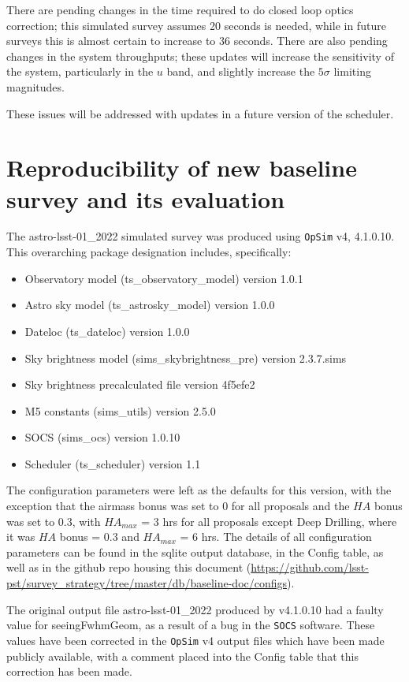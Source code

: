 \documentclass[DM,authoryear,toc]{lsstdoc}
\newcommand{\opsim}{\texttt{OpSim}\xspace}
\newcommand{\socs}{\texttt{SOCS}\xspace}
\begin{document}
There are pending changes in the time required to do closed loop optics correction; this simulated survey assumes 20 seconds is needed, while in future surveys this is almost certain to increase to 36 seconds.  There are also pending changes in the system throughputs; these updates will increase the sensitivity of the system, particularly in the $u$ band, and slightly increase the $5\sigma$ limiting magnitudes. 

These issues will be addressed with updates in a future version of the scheduler.

\section{Reproducibility of new baseline survey and its evaluation}

The astro-lsst-01\_2022  simulated survey was produced using \opsim v4, 4.1.0.10.  This overarching package designation includes, specifically:
\begin{itemize}
\item Observatory model (ts\_observatory\_model) version 1.0.1
\item Astro sky model (ts\_astrosky\_model) version 1.0.0
\item Dateloc (ts\_dateloc) version 1.0.0
\item Sky brightness model (sims\_skybrightness\_pre) version 2.3.7.sims
\item Sky brightness precalculated file version 4f5efe2
\item M5 constants (sims\_utils) version 2.5.0 
\item SOCS (sims\_ocs) version 1.0.10
\item Scheduler (ts\_scheduler) version 1.1
\end{itemize}

The configuration parameters were left as the defaults for this version, with the exception that the airmass bonus was set to 0 for all proposals and the $HA$ bonus was set to 0.3, with $HA_{max}$ = 3 hrs for all proposals except Deep Drilling, where it was $HA$ bonus = 0.3 and $HA_{max}$ = 6 hrs. The details of all configuration parameters can be found in the sqlite output database, in the Config table, as well as in the github repo housing this document (\url{https://github.com/lsst-pst/survey_strategy/tree/master/db/baseline-doc/configs}).

The original output file astro-lsst-01\_2022 produced by v4.1.0.10 had a faulty value for seeingFwhmGeom, as a result of a bug in the \socs software. These values have been corrected in the \opsim v4 output files which have been made publicly available, with a comment placed into the Config table that this correction has been made.
\end{document}
